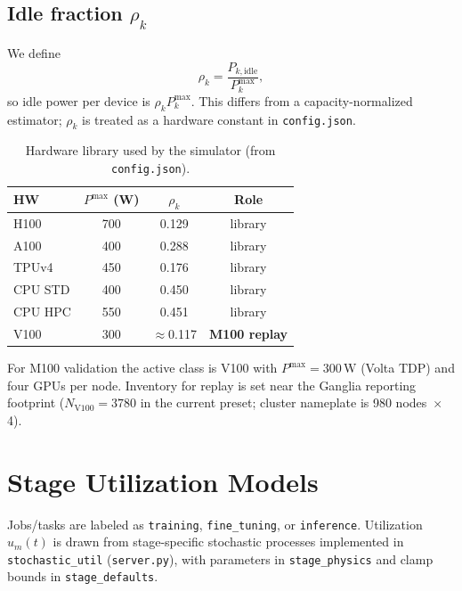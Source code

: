 \documentclass[10pt,a4paper,twocolumn]{article}
\begin{document}
\subsection{Idle fraction $\rho_k$}

We define
\begin{equation}
  \rho_k=\frac{P_{k,\mathrm{idle}}}{P_k^{\max}},
  \label{eq:rho}
\end{equation}
so idle power per device is $\rho_k P_k^{\max}$. This differs from a
capacity-normalized estimator; $\rho_k$ is treated as a hardware constant
in \texttt{config.json}.

\begin{table}[H]
\centering
\caption{Hardware library used by the simulator (from \texttt{config.json}).}
\label{tab:hw}
\renewcommand{\arraystretch}{1.15}
\small
\begin{tabular}{lccc}
\toprule
HW & $P^{\max}$ (W) & $\rho_k$ & Role \\
\midrule
H100    & 700 & 0.129 & library \\
A100    & 400 & 0.288 & library \\
TPUv4   & 450 & 0.176 & library \\
CPU STD & 400 & 0.450 & library \\
CPU HPC & 550 & 0.451 & library \\
V100    & 300 & $\approx$0.117 & \textbf{M100 replay} \\
\bottomrule
\end{tabular}
\end{table}

\noindent For M100 validation the active class is V100 with
$P^{\max}=300\,\mathrm{W}$ (Volta TDP) and four GPUs per node. Inventory for
replay is set near the Ganglia reporting footprint
($N_{\mathrm{V100}}=3780$ in the current preset; cluster nameplate is
980 nodes~$\times$4).

\section{Stage Utilization Models}
\label{sec:stages}

Jobs/tasks are labeled as \texttt{training}, \texttt{fine\_tuning}, or
\texttt{inference}. Utilization $u_m(t)$ is drawn from stage-specific
stochastic processes implemented in \texttt{stochastic\_util}
(\texttt{server.py}), with parameters in \texttt{stage\_physics} and clamp
bounds in \texttt{stage\_defaults}.
\end{document}
